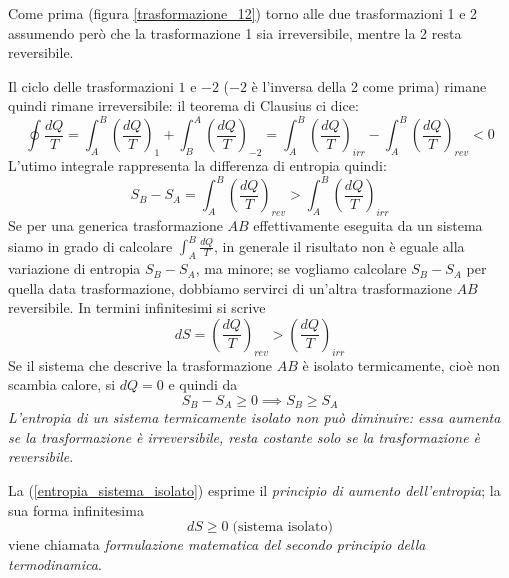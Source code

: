 \documentclass[class=book, crop=false, oneside, 12pt]{standalone}
\begin{document}
Come prima (figura \ref{trasformazione_12}) torno alle due trasformazioni 1 e 2 assumendo però che la trasformazione 1 sia irreversibile, mentre la 2 resta reversibile.

Il ciclo delle trasformazioni \(1\) e \(-2\) (\(-2\) è l'inversa della 2 come prima) rimane quindi rimane irreversibile: il teorema di Clausius ci dice:
\begin{equation*}
    \oint \frac{d Q}{T} = \int_A^B \left(\frac{d Q}{T}\right)_1 + \int_B^A \left(\frac{d Q}{T}\right)_{-2} = \int_A^B \left(\frac{d Q}{T}\right)_{irr} - \int_A^B \left(\frac{d Q}{T}\right)_{rev} < 0
\end{equation*}
L'utimo integrale rappresenta la differenza di entropia quindi:
\begin{equation}
    S_B - S_A = \int_A^B \left(\frac{d Q}{T}\right)_{rev} > \int_A^B \left(\frac{d Q}{T}\right)_{irr}
\end{equation}
Se per una generica trasformazione \(A B\) effettivamente eseguita da un sistema siamo in grado di calcolare \(\int_A^B \frac{d Q}{T}\), in generale il risultato non è eguale alla variazione di entropia \(S_B - S_A\), ma minore;
se vogliamo calcolare \(S_B - S_A\) per quella data trasformazione, dobbiamo servirci di un'altra trasformazione \(A B\) reversibile.
In termini infinitesimi si scrive
\begin{equation}
    d S = \left(\frac{d Q}{T}\right)_{rev} > \left(\frac{d Q}{T}\right)_{irr}
\end{equation}
Se il sistema che descrive la trasformazione \(A B\) è isolato termicamente, cioè non scambia calore, si \(d Q = 0\) e quindi da
\begin{equation} \label{entropia_sistema_isolato}
    S_B - S_A \geq 0 \implies S_B \geq S_A
\end{equation}
\emph{L'entropia di un sistema termicamente isolato non può diminuire: essa aumenta se la trasformazione è irreversibile, resta costante solo se la trasformazione è reversibile}.

La (\ref{entropia_sistema_isolato}) esprime il \emph{principio di aumento dell'entropia}; la sua forma infinitesima
\begin{equation}
    d S \geq 0 \; \text{(sistema isolato)}
\end{equation}
viene chiamata \emph{formulazione matematica del secondo principio della termodinamica}.
\end{document}
